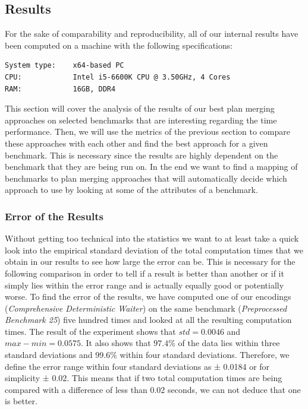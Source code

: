 \documentclass{llncs}
\begin{document}
\subsection{Results}
For the sake of comparability and reproducibility, all of our internal results have been computed on a machine with the following specifications:
\begin{verbatim}
System type:    x64-based PC
CPU:            Intel i5-6600K CPU @ 3.50GHz, 4 Cores
RAM:            16GB, DDR4
\end{verbatim}



This section will cover the analysis of the results of our best plan merging approaches on selected benchmarks that are interesting regarding the time performance. Then, we will use the metrics of the previous section to compare these approaches with each other and find the best approach for a given benchmark. This is necessary since the results are highly dependent on the benchmark that they are being run on. In the end we want to find a mapping of benchmarks to plan merging approaches that will automatically decide which approach to use by looking at some of the attributes of a benchmark.\\

\subsubsection{Error of the Results}
Without getting too technical into the statistics we want to at least take a quick look into the empirical standard deviation of the total computation times that we obtain in our results to see how large the error can be. This is necessary for the following comparison in order to tell if a result is better than another or if it simply lies within the error range and is actually equally good or potentially worse. To find the error of the results, we have computed one of our encodings (\emph{Comprehensive Deterministic Waiter}) on the same benchmark (\emph{Preprocessed Benchmark 25}) five hundred times and looked at all the resulting computation times. The result of the experiment shows that $std = 0.0046$ and $max - min = 0.0575$. It also shows that $97.4\%$ of the data lies within three standard deviations and $99.6\%$ within four standard deviations. Therefore, we define the error range within four standard deviations as ± 0.0184 or for simplicity ± 0.02.
This means that if two total computation times are being compared with a difference of less than 0.02 seconds, we can not deduce that one is better.
\end{document}
